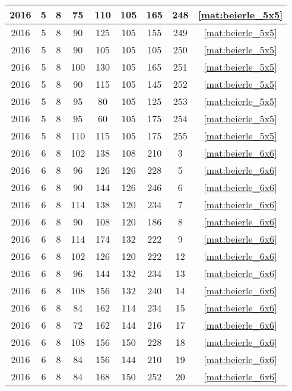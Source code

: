 \begin{longtable}{|c|c|c|c|c|c|c|c|c|}
2016 & 5 & 8 & 75 & 110 & 105 & 165 & 248 & \eqref{mat:beierle_5x5} \\ \hline 
2016 & 5 & 8 & 90 & 125 & 105 & 155 & 249 & \eqref{mat:beierle_5x5} \\ \hline 
2016 & 5 & 8 & 90 & 105 & 105 & 105 & 250 & \eqref{mat:beierle_5x5} \\ \hline 
2016 & 5 & 8 & 100 & 130 & 105 & 165 & 251 & \eqref{mat:beierle_5x5} \\ \hline 
2016 & 5 & 8 & 90 & 115 & 105 & 145 & 252 & \eqref{mat:beierle_5x5} \\ \hline 
2016 & 5 & 8 & 95 & 80 & 105 & 125 & 253 & \eqref{mat:beierle_5x5} \\ \hline 
2016 & 5 & 8 & 95 & 60 & 105 & 175 & 254 & \eqref{mat:beierle_5x5} \\ \hline 
2016 & 5 & 8 & 110 & 115 & 105 & 175 & 255 & \eqref{mat:beierle_5x5} \\ \hline 
2016 & 6 & 8 & 102 & 138 & 108 & 210 & 3 & \eqref{mat:beierle_6x6} \\ \hline 
2016 & 6 & 8 & 96 & 126 & 126 & 228 & 5 & \eqref{mat:beierle_6x6} \\ \hline 
2016 & 6 & 8 & 90 & 144 & 126 & 246 & 6 & \eqref{mat:beierle_6x6} \\ \hline 
2016 & 6 & 8 & 114 & 138 & 120 & 234 & 7 & \eqref{mat:beierle_6x6} \\ \hline 
2016 & 6 & 8 & 90 & 108 & 120 & 186 & 8 & \eqref{mat:beierle_6x6} \\ \hline 
2016 & 6 & 8 & 114 & 174 & 132 & 222 & 9 & \eqref{mat:beierle_6x6} \\ \hline 
2016 & 6 & 8 & 102 & 126 & 120 & 222 & 12 & \eqref{mat:beierle_6x6} \\ \hline 
2016 & 6 & 8 & 96 & 144 & 132 & 234 & 13 & \eqref{mat:beierle_6x6} \\ \hline 
2016 & 6 & 8 & 108 & 156 & 132 & 240 & 14 & \eqref{mat:beierle_6x6} \\ \hline 
2016 & 6 & 8 & 84 & 162 & 114 & 234 & 15 & \eqref{mat:beierle_6x6} \\ \hline 
2016 & 6 & 8 & 72 & 162 & 144 & 216 & 17 & \eqref{mat:beierle_6x6} \\ \hline 
2016 & 6 & 8 & 108 & 156 & 150 & 228 & 18 & \eqref{mat:beierle_6x6} \\ \hline 
2016 & 6 & 8 & 84 & 156 & 144 & 210 & 19 & \eqref{mat:beierle_6x6} \\ \hline 
2016 & 6 & 8 & 84 & 168 & 150 & 252 & 20 & \eqref{mat:beierle_6x6} \\ \hline 

\end{longtable}
